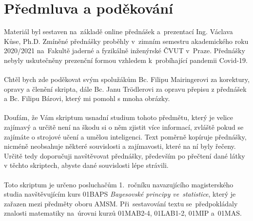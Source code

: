 \chapter*{Předmluva a poděkování}

Materiál byl sestaven na~základě online přednášek a~prezentací Ing. Václava Kůse, Ph.D. Zmíněné přednášky proběhly v~zimním semestru akademického roku 2020/2021 na~Fakultě jaderné a
fyzikálně inženýrské ČVUT v~Praze. Přednášky nebyly uskutečněny prezenční formou vzhledem k~probíhající pandemii Covid-19. 
\\ \\
Chtěl bych zde poděkovat svým spolužákům Bc. Filipu Mairingerovi za korektury, opravy a členění skripta, dále Bc. Janu Trödlerovi za opravu přepisu z přednášek a Bc. Filipu Bárovi, který mi pomohl s mnoha obrázky.
\\ \\
Doufám, že Vám skriptum usnadní studium tohoto předmětu, který je velice zajímavý a určitě není na škodu si o něm zjistit více informací, zvláště pokud se zajímáte o strojové učení a umělou inteligenci. Text poměrně kopíruje přednášky, nicméně neobsahuje některé souvislosti a zajímavosti, které na ní byly řečeny. Určitě tedy doporučuji navštěvovat přednášky, především po přečtení dané látky v těchto skriptech, abyste dané souvislosti lépe strávili.
\\ \\
Toto skriptum je určeno posluchačům 1.~ročníku navazujícího magisterského studia navštěvujícím kurs 01BAPS\emph{ Bayesovské principy ve~statistice}, který je zařazen
mezi předměty oboru AMSM. Při~sestavování textu se~předpokládaly znalosti matematiky na~úrovni kurzů 01MAB2-4, 01LAB1-2, 01MIP a~01MAS.
